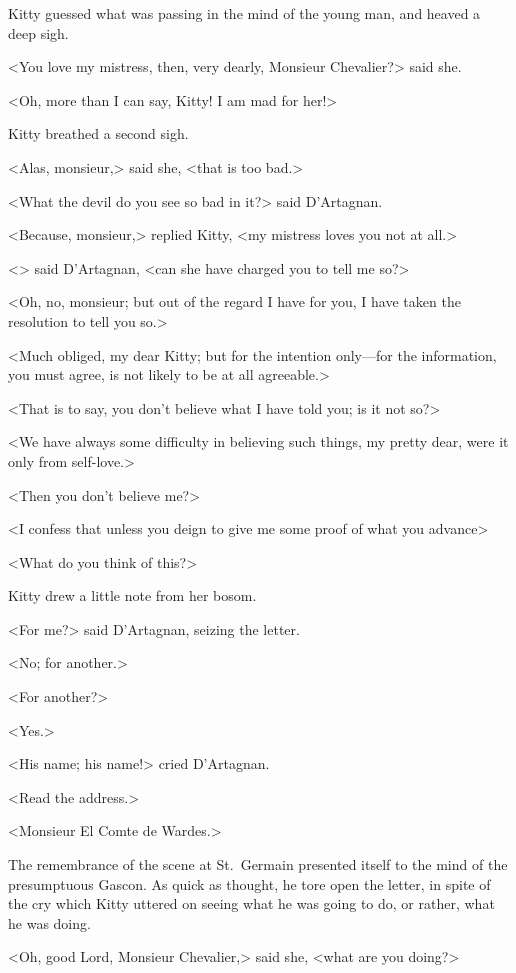 Kitty guessed what was passing in the mind of the young man, and heaved a deep sigh. 

<You love my mistress, then, very dearly, Monsieur Chevalier?> said she. 

<Oh, more than I can say, Kitty! I am mad for her!> 

Kitty breathed a second sigh. 

<Alas, monsieur,> said she, <that is too bad.> 

<What the devil do you see so bad in it?> said D'Artagnan. 

<Because, monsieur,> replied Kitty, <my mistress loves you not at all.> 

<> said D'Artagnan, <can she have charged you to tell me so?> 

<Oh, no, monsieur; but out of the regard I have for you, I have taken the resolution to tell you so.> 

<Much obliged, my dear Kitty; but for the intention only—for the information, you must agree, is not likely to be at all agreeable.> 

<That is to say, you don't believe what I have told you; is it not so?> 

<We have always some difficulty in believing such things, my pretty dear, were it only from self-love.> 

<Then you don't believe me?> 

<I confess that unless you deign to give me some proof of what you advance\longdash> 

<What do you think of this?> 

Kitty drew a little note from her bosom. 

<For me?> said D'Artagnan, seizing the letter. 

<No; for another.> 

<For another?> 

<Yes.> 

<His name; his name!> cried D'Artagnan. 

<Read the address.> 

<Monsieur El Comte de Wardes.> 

The remembrance of the scene at St.~Germain presented itself to the mind of the presumptuous Gascon. As quick as thought, he tore open the letter, in spite of the cry which Kitty uttered on seeing what he was going to do, or rather, what he was doing. 

<Oh, good Lord, Monsieur Chevalier,> said she, <what are you doing?> 

